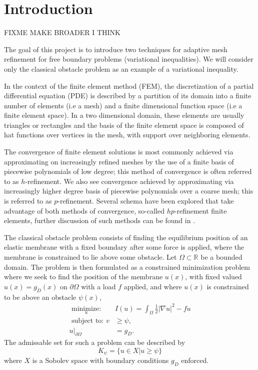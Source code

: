 \documentclass[]{interact}
\theoremstyle{plain}%
\theoremstyle{definition}
\theoremstyle{remark}
\newcommand{\RR}{\mathbb{R}}
\newcommand{\abs}[1]{\left| #1 \right|}
\begin{document}


\section{Introduction} \label{sec:intro}

FIXME MAKE BROADER I THINK

The goal of this project is to introduce two techniques for adaptive mesh refinement for free boundary problems (variational inequalities). We will consider only the classical obstacle problem as an example of a variational inequality. 

In the context of the finite element method (FEM), the discretization of a partial differential equation (PDE) is described by a partition of its domain into a finite number of elements (i.e a mesh) and a finite dimensional function space (i.e a finite element space). In a two dimensional domain, these elements are usually triangles or rectangles and the basis of the finite element space is composed of hat functions over vertices in the mesh, with support over neighboring elements. 

The convergence of finite element solutions is most commonly achieved via approximating on increasingly refined meshes by the use of a finite basis of piecewise polynomials of low degree; this method of convergence is often referred to as $h$-refinement. We also see convergence achieved by approximating via increasingly higher degree basis of piecewise polynomials over a coarse mesh; this is referred to as $p$-refinement. Several schema have been explored that take advantage of both methods of convergence, so-called $hp$-refinement finite elements, further discussion of such methods can be found in \citet{demkowicz_computing_2007}.

The classical obstacle problem consists of finding the equilibrium position of an elastic membrane with a fixed boundary after some force is applied, where the membrane is constrained to lie above some obstacle. Let $\Omega \subset \RR$ be a bounded domain. The problem is then formulated as a constrained minimization problem where we seek to find the position of the membrane $u(x)$, with fixed valued $u(x) = g_D(x)$ on $\partial \Omega$ with a load $f$ applied, and where $u(x)$ is constrained to be above an obstacle $\psi(x)$, 
\begin{align}
    \underset{u}{\text{ minimize: }}  &I(u) = \int_\Omega \frac{1}{2} \abs{\nabla u}^2 - fu \\
  \text{ subject to: } v &\geq \psi, \\
    u |_{\partial\Omega} &= g_D. 
  \end{align}
  The admissable set for such a problem can be described by 
  \begin{equation}
    K_\psi = \{u \in X| u \geq \psi \}
  \end{equation}
  where $X$ is a Sobolev space with boundary conditions $g_D$ enforced. 
  
\end{document}
